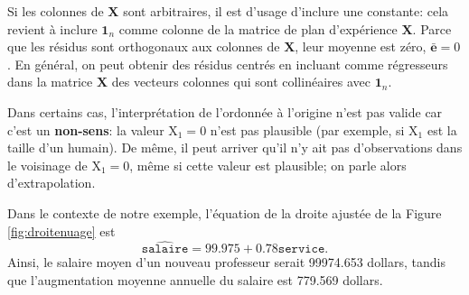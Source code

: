 \documentclass[
  11pt,
  letterpaper,
]{article}
\theoremstyle{definition}
\theoremstyle{definition}
\theoremstyle{definition}
\theoremstyle{remark}
\begin{document}
Si les colonnes de \(\mathbf{X}\) sont arbitraires, il est d'usage d'inclure une constante: cela revient à inclure \(\mathbf{1}_n\) comme colonne de la matrice de plan d'expérience \(\mathbf{X}\). Parce que les résidus sont orthogonaux aux colonnes de \(\mathbf{X}\), leur moyenne est zéro, \(\bar{\boldsymbol{e}}=0\). En général, on peut obtenir des résidus centrés en incluant comme régresseurs dans la matrice \(\mathbf{X}\) des vecteurs colonnes qui sont collinéaires avec \(\mathbf{1}_n\).

Dans certains cas, l'interprétation de l'ordonnée à l'origine n'est pas valide car c'est un \textbf{non-sens}: la valeur \(\mathrm{X}_1=0\) n'est pas plausible (par exemple, si \(\mathrm{X}_1\) est la taille d'un humain). De même, il peut arriver qu'il n'y ait pas d'observations dans le voisinage de \(\mathrm{X}_1=0\), même si cette valeur est plausible; on parle alors d'extrapolation.

Dans le contexte de notre exemple, l'équation de la droite ajustée de la Figure \ref{fig:droitenuage} est \[\widehat{\texttt{salaire}} = 99.975 + 0.78\texttt{service}.\]
Ainsi, le salaire moyen d'un nouveau professeur serait 99974.653 dollars, tandis que l'augmentation moyenne annuelle du salaire est 779.569 dollars.
\end{document}

